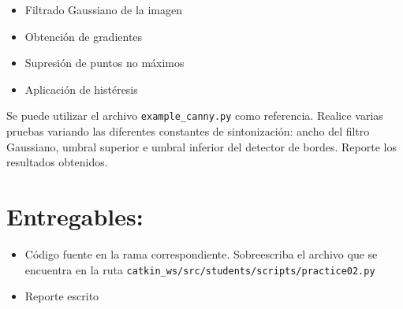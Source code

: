 \documentclass[letterpaper,11pt]{article}
\begin{document}
\begin{itemize}
\item Filtrado Gaussiano de la imagen
\item Obtención de gradientes
\item Supresión de puntos no máximos
\item Aplicación de histéresis
\end{itemize}

Se puede utilizar el archivo \texttt{example\_canny.py} como referencia. Realice varias pruebas variando las diferentes constantes de sintonización: ancho del filtro Gaussiano, umbral superior e umbral inferior del detector de bordes. Reporte los resultados obtenidos. 

\section*{Entregables:}
\begin{itemize}
\item Código fuente en la rama correspondiente. Sobreescriba el archivo que se encuentra en la ruta \texttt{catkin\_ws/src/students/scripts/practice02.py}
\item Reporte escrito
\end{itemize}
\end{document}
